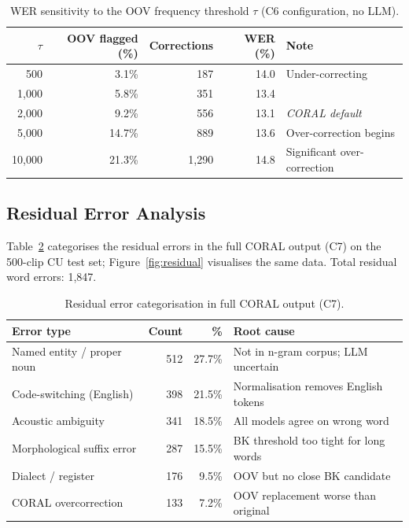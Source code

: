 \begin{table}[h]
    \centering
    \renewcommand{\arraystretch}{1.25}
    \begin{tabular}{rrrrl}
    \toprule
    \textbf{$\tau$} & \textbf{OOV flagged (\%)} & \textbf{Corrections} & \textbf{WER (\%)} & \textbf{Note} \\
    \midrule
       500 &  3.1\% &  187 & 14.0 & Under-correcting \\
     1{,}000 &  5.8\% &  351 & 13.4 & \\
     2{,}000 &  9.2\% &  556 & 13.1 & \emph{CORAL default} \\
     5{,}000 & 14.7\% &  889 & 13.6 & Over-correction begins \\
    10{,}000 & 21.3\% & 1{,}290 & 14.8 & Significant over-correction \\
    \bottomrule
    \end{tabular}
    \caption{WER sensitivity to the OOV frequency threshold $\tau$ (C6 configuration, no LLM).}
    \label{tab:oov-threshold}
\end{table}

\subsection{Residual Error Analysis}
\label{ssec:residual-errors}

Table~\ref{tab:residual} categorises the residual errors in the full CORAL output (C7) on the 500-clip CU test set; Figure~\ref{fig:residual} visualises the same data. Total residual word errors: 1{,}847.

\begin{table}[h]
    \centering
    \renewcommand{\arraystretch}{1.25}
    \small
    \begin{tabular}{p{4cm}rrp{6cm}}
    \toprule
    \textbf{Error type} & \textbf{Count} & \textbf{\%} & \textbf{Root cause} \\
    \midrule
    Named entity / proper noun  & 512 & 27.7\% & Not in n-gram corpus; LLM uncertain \\
    Code-switching (English)    & 398 & 21.5\% & Normalisation removes English tokens \\
    Acoustic ambiguity          & 341 & 18.5\% & All models agree on wrong word \\
    Morphological suffix error  & 287 & 15.5\% & BK threshold too tight for long words \\
    Dialect / register          & 176 &  9.5\% & OOV but no close BK candidate \\
    CORAL overcorrection        & 133 &  7.2\% & OOV replacement worse than original \\
    \bottomrule
    \end{tabular}
    \caption{Residual error categorisation in full CORAL output (C7).}
    \label{tab:residual}
\end{table}

